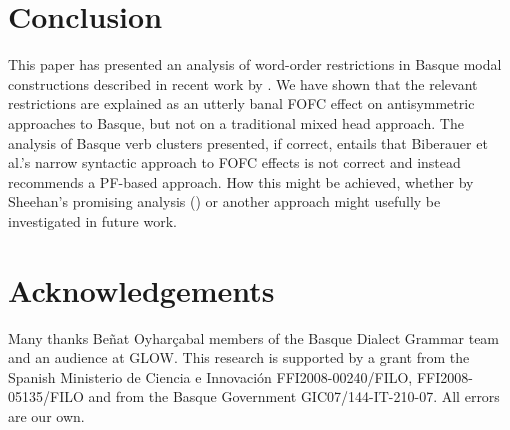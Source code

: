 \documentclass[output=paper]{langscibook}
\begin{document}
\section{Conclusion}
This paper has presented an analysis of word-order restrictions in Basque modal constructions described in recent work by \cite{etxepare-uribeetxebarria2009, etxepare-uribeetxebarria2012}.  We have shown that the relevant restrictions are explained as an utterly banal FOFC effect on antisymmetric approaches to Basque, but not on a traditional mixed head approach.  The analysis of Basque verb clusters presented, if correct, entails that Biberauer et al.'s narrow syntactic approach to FOFC effects is not correct and instead recommends a PF-based approach. How this might be achieved, whether by Sheehan's promising analysis (\citeyear{sheehan2013a,sheehan2013b}) or another approach might usefully be investigated in future work.
	
\section*{Acknowledgements}
	
	
	Many  thanks Be\~nat Oyhar\c cabal members of the Basque Dialect Grammar team and an audience at GLOW. This research is supported by a grant from the Spanish Ministerio de Ciencia e Innovaci\'on FFI2008-00240/FILO, FFI2008-05135/FILO and from the Basque Government GIC07/144-IT-210-07. All errors are our own.
	
\printbibliography[heading=subbibliography,notkeyword=this]

%
%
%
\end{document}
